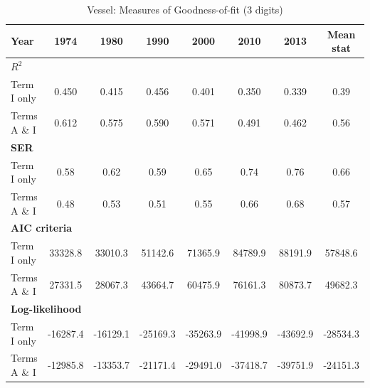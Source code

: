 \documentclass[a4paper,11pt]{article}
\begin{document}
\begin{table}[htbp]
  \centering
  \caption{Vessel: Measures of Goodness-of-fit (3 digits)}
    \footnotesize{
\begin{center}
\begin{tabular}{l|cccccc|c}
\hline \hline
Year  & \multicolumn{1}{c}{1974} & \multicolumn{1}{c}{1980} & \multicolumn{1}{c}{1990} & \multicolumn{1}{c}{2000} & 2010  & \multicolumn{1}{c}{2013} & Mean stat \\ \hline
\multicolumn{8}{l}{\bf{$R^2$} }\\ \hline
Term I only & \multicolumn{1}{c}{0.450} & \multicolumn{1}{c}{0.415} & \multicolumn{1}{c}{0.456} & \multicolumn{1}{c}{0.401} & 0.350 & \multicolumn{1}{c}{0.339} & 0.39 \\
Terms A \& I & \multicolumn{1}{c}{0.612} & \multicolumn{1}{c}{0.575} & \multicolumn{1}{c}{0.590} & \multicolumn{1}{c}{0.571} & 0.491 & \multicolumn{1}{c}{0.462} & 0.56 \\ \hline
\multicolumn{8}{l}{\textbf{SER}  }  \\ \hline
    Term I only & \multicolumn{1}{c}{0.58} & \multicolumn{1}{c}{0.62} & \multicolumn{1}{c}{0.59} & \multicolumn{1}{c}{0.65} & 0.74  & \multicolumn{1}{c}{0.76} & 0.66 \\
    Terms A \& I & \multicolumn{1}{c}{0.48} & \multicolumn{1}{c}{0.53} & \multicolumn{1}{c}{0.51} & \multicolumn{1}{c}{0.55} & 0.66  & \multicolumn{1}{c}{0.68} & 0.57 \\ \hline
   \multicolumn{8}{l}{\textbf{AIC criteria}}  \\ \hline
    Term I only & \multicolumn{1}{c}{33328.8} & \multicolumn{1}{c}{33010.3} & \multicolumn{1}{c}{51142.6} & \multicolumn{1}{c}{71365.9} & 84789.9 & \multicolumn{1}{c}{88191.9} & 57848.6 \\
    Terms A \& I & \multicolumn{1}{c}{27331.5} & \multicolumn{1}{c}{28067.3} & \multicolumn{1}{c}{43664.7} & \multicolumn{1}{c}{60475.9} & 76161.3 & \multicolumn{1}{c}{80873.7} & 49682.3 \\ \hline
    \multicolumn{8}{l}{\textbf{Log-likelihood}} \\ \hline
    Term I only & \multicolumn{1}{c}{-16287.4} & \multicolumn{1}{c}{-16129.1} & \multicolumn{1}{c}{-25169.3} & \multicolumn{1}{c}{-35263.9} & -41998.9 & \multicolumn{1}{c}{-43692.9} & -28534.3 \\
    Terms A \& I & \multicolumn{1}{c}{-12985.8} & \multicolumn{1}{c}{-13353.7} & \multicolumn{1}{c}{-21171.4} & \multicolumn{1}{c}{-29491.0} & -37418.7 & \multicolumn{1}{c}{-39751.9} & -24151.3 \\

\end{tabular}
\end{center}}
\end{table}
\end{document}
